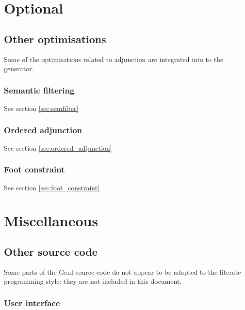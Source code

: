 \documentclass[a4paper,11pt]{report}
\begin{document}



\part{Optional}




\chapter{Other optimisations}
\label{chp:other_optimisations}

Some of the optimisations related to adjunction are integrated into
to the generator.

\section{Semantic filtering}

See section \ref{sec:semfilter}

\section{Ordered adjunction}

See section \ref{sec:ordered_adjunction}

\section{Foot constraint}

See section \ref{sec:foot_constraint}

\part{Miscellaneous}

\chapter{Other source code}
\label{cha:other}

Some parts of the GenI source code do not appear to be adapted to the
literate programming style: they are not included in this document.

\section{User interface}
\end{document}

